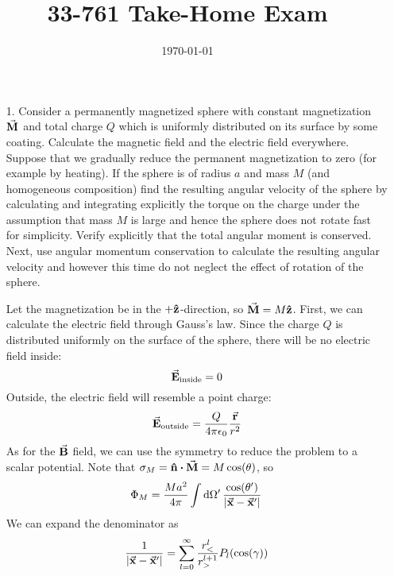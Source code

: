 \documentclass[a4paper,twoside]{article}
\title{33-761 Take-Home Exam}
\date{\today}
\begin{document}
\maketitle

\begin{itemize}
    \item[1.] Consider a permanently magnetized sphere with constant magnetization $ \va{M} $ and total charge $ Q $ which is uniformly distributed on its surface by some coating. Calculate the magnetic field and the electric field everywhere. Suppose that we gradually reduce the permanent magnetization to zero (for example by heating). If the sphere is of radius $ a $ and mass $ M $ (and homogeneous composition) find the resulting angular velocity of the sphere by calculating and integrating explicitly the torque on the charge under the assumption that mass $ M $ is large and hence the sphere does not rotate fast for simplicity. Verify explicitly that the total angular moment is conserved. Next, use angular momentum conservation to calculate the resulting angular velocity and however this time do not neglect the effect of rotation of the sphere.
        \begin{problem}
            Let the magnetization be in the $ + \vu{z} $-direction, so $ \va{M} = M \vu{z} $. First, we can calculate the electric field through Gauss's law. Since the charge $ Q $ is distributed uniformly on the surface of the sphere, there will be no electric field inside:
            \begin{equation}
                \va{E}_{\text{inside}} = 0
            \end{equation}
            Outside, the electric field will resemble a point charge:
            \begin{equation}
                \va{E}_{\text{outside}} = \frac{Q}{4 \pi \epsilon_0} \frac{ \va{r}}{r^2}
            \end{equation}
            As for the $ \va{B} $ field, we can use the symmetry to reduce the problem to a scalar potential. Note that $ \sigma_{M} = \vu{n} \vdot \va{M} = M \cos(\theta) $, so
            \begin{equation}
                \Phi_{M} = \frac{M a^2}{4 \pi} \int \dd{\Omega'} \frac{\cos(\theta')}{\abs{ \va{x} - \va{x}'}}
            \end{equation}
            We can expand the denominator as
            \begin{equation}
                \frac{1}{\abs{ \va{x} - \va{x}'}} = \sum_{l=0}^{\infty} \frac{r_<^l}{r_>^{l+1}} P_l(\cos(\gamma))

\end{equation}
\end{problem}
\end{itemize}
\end{document}
